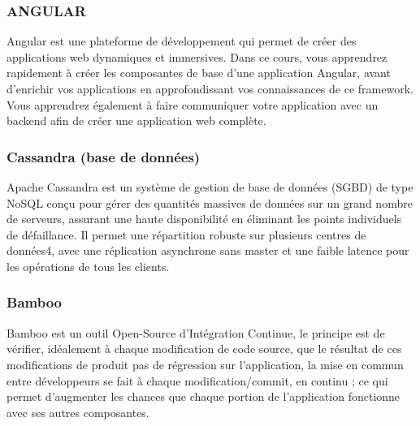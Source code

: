                   
                  \subsubsection{ANGULAR}
                  Angular est une plateforme de développement qui permet de créer des applications web dynamiques et immersives.  Dans ce cours, vous apprendrez rapidement à créer les composantes de base d'une application Angular, avant d'enrichir vos applications en approfondissant vos connaissances de ce framework.  Vous apprendrez également à faire communiquer votre application avec un backend afin de créer une application web complète.
                  
                   \subsubsection{Cassandra (base de données)}
                   Apache Cassandra est un système de gestion de base de données (SGBD) de type NoSQL conçu pour gérer des quantités massives de données sur un grand nombre de serveurs, assurant une haute disponibilité en éliminant les points individuels de défaillance. Il permet une répartition robuste sur plusieurs centres de données4, avec une réplication asynchrone sans master et une faible latence pour les opérations de tous les clients.
                   \subsubsection{Bamboo}
                   Bamboo est un outil Open-Source d’Intégration Continue, le principe est de vérifier, idéalement à chaque modification de code source, que le
résultat de ces modifications de produit pas de régression sur l’application, la mise en commun entre développeurs se fait à chaque
modification/commit, en continu ; ce qui permet d’augmenter les chances que chaque portion de l’application fonctionne avec ses autres
composantes.
                  
                  
































